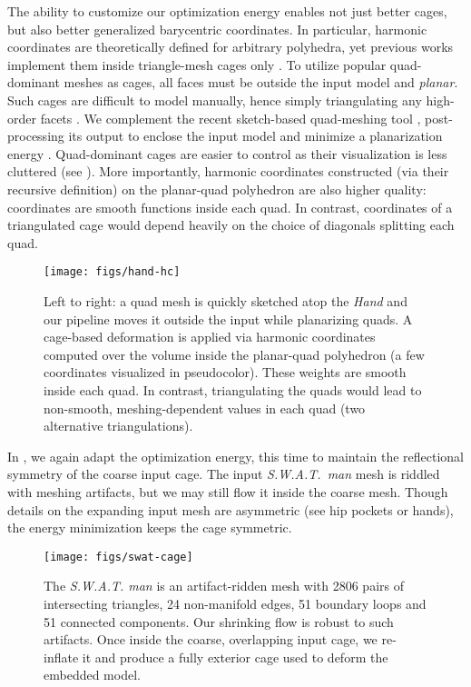 The ability to customize our optimization energy enables not just better cages,
but also better generalized barycentric coordinates. In particular, harmonic
coordinates are theoretically defined for arbitrary polyhedra, yet previous
works implement them inside triangle-mesh cages only
\cite{HarmonicCoodinates07}.
%
To utilize popular quad-dominant meshes as cages, all faces must be outside the
input model and \emph{planar}.
%
Such cages are difficult to model manually, hence simply triangulating any
high-order facets \cite{HarmonicCoodinates07}.
%
We complement the recent sketch-based quad-meshing tool \cite{Takayama:2013},
post-processing its output to enclose the input model and minimize a
planarization energy \cite{poranne2013interactive}.
%
Quad-dominant cages are easier to control as their visualization is less
cluttered (see ).
%
More importantly, harmonic coordinates constructed (via their recursive
definition) on the planar-quad polyhedron are also higher quality: coordinates
are smooth functions inside each quad.
%
In contrast, coordinates of a triangulated cage would depend heavily on the
choice of diagonals splitting each quad.

\begin{figure}
  \texttt{[image: figs/hand-hc]}
  \caption{Left to right: a quad mesh is quickly sketched atop the \emph{Hand}
  and our pipeline moves it outside the input while planarizing quads. A
  cage-based deformation is applied via harmonic coordinates computed over the
  volume inside the planar-quad polyhedron (a few coordinates visualized in
  pseudocolor). These weights are smooth inside each quad. In contrast,
  triangulating the quads would lead to non-smooth, meshing-dependent values in
  each quad (two alternative triangulations).}
  \label{fig:hand-hc}
\end{figure}

In , we again adapt the optimization energy, this time to
maintain the reflectional symmetry of the coarse input cage.
%
The input \emph{S.W.A.T.\ man} mesh is riddled with meshing artifacts, but we
may still flow it inside the coarse mesh.
%
Though details on the expanding input mesh are asymmetric (see hip pockets or
hands), the energy minimization keeps the cage symmetric.

\begin{figure}
  \texttt{[image: figs/swat-cage]}
  \caption{The \emph{S.W.A.T. man} is an artifact-ridden mesh with 2806 pairs
  of intersecting triangles, 24 non-manifold edges, 51 boundary loops and 51
  connected components. Our shrinking flow is robust to such artifacts. Once
  inside the coarse, overlapping input cage, we re-inflate it and produce a
  fully exterior cage used to deform the embedded model.}
  \label{fig:swat-cage}
\end{figure}

